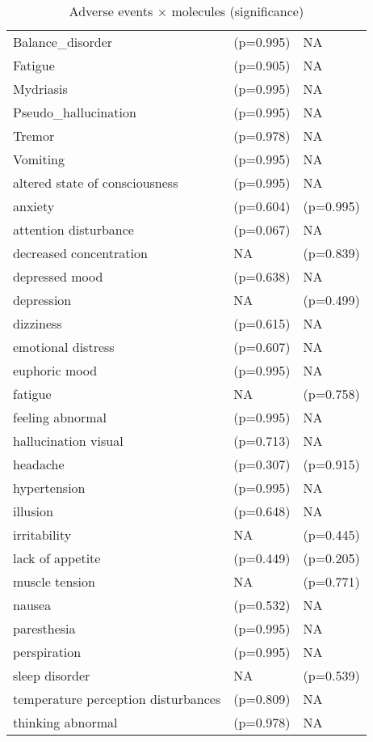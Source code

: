 \begin{table}[!h]
\centering
\caption{Adverse events × molecules (significance)}
\centering
\begin{tabular}[t]{lll}
\toprule
Balance\_disorder & (p=0.995) & NA\\
Fatigue & (p=0.905) & NA\\
Mydriasis & (p=0.995) & NA\\
Pseudo\_hallucination & (p=0.995) & NA\\
Tremor & (p=0.978) & NA\\
\addlinespace
Vomiting & (p=0.995) & NA\\
altered state of consciousness & (p=0.995) & NA\\
anxiety & (p=0.604) & (p=0.995)\\
attention disturbance & (p=0.067) & NA\\
decreased concentration & NA & (p=0.839)\\
\addlinespace
depressed mood & (p=0.638) & NA\\
depression & NA & (p=0.499)\\
dizziness & (p=0.615) & NA\\
emotional distress & (p=0.607) & NA\\
euphoric mood & (p=0.995) & NA\\
\addlinespace
fatigue & NA & (p=0.758)\\
feeling abnormal & (p=0.995) & NA\\
hallucination visual & (p=0.713) & NA\\
headache & (p=0.307) & (p=0.915)\\
hypertension & (p=0.995) & NA\\
\addlinespace
illusion & (p=0.648) & NA\\
irritability & NA & (p=0.445)\\
lack of appetite & (p=0.449) & (p=0.205)\\
muscle tension & NA & (p=0.771)\\
nausea & (p=0.532) & NA\\
\addlinespace
paresthesia & (p=0.995) & NA\\
perspiration & (p=0.995) & NA\\
sleep disorder & NA & (p=0.539)\\
temperature perception disturbances & (p=0.809) & NA\\
thinking abnormal & (p=0.978) & NA\\
\bottomrule
\end{tabular}
\end{table}
